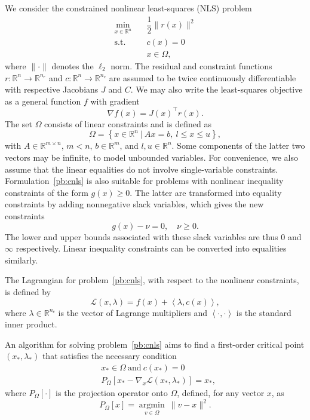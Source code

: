 \documentclass[pdflatex,sn-mathphys-num]{sn-jnl}%
\theoremstyle{thmstyleone}%
\newcommand{\RR}{{\mathbb{R}}} %
\newcommand{\calL}{{\mathcal{L}}}
\providecommand{\argmin}{\operatorname*{argmin}}
\newcommand{\inner}[2]{\left\langle {#1} , {#2} \right\rangle} %
\newcommand{\proj}[2]{P_{#1} \left[ {#2} \right]} %
\begin{document}
We consider the constrained nonlinear least-squares (NLS) problem
\begin{equation}
	\label{pb:cnls}
	\begin{aligned}
		\min_{x\in \RR^n} \quad & \dfrac{1}{2} \|r(x)\|^2 \\
		\text{s.t.} \quad & c(x) = 0 \\
		& x \in \Omega,
	\end{aligned}
\end{equation}
where $\|\cdot\|$ denotes the $\ell_2$ norm. The residual and constraint functions $r\colon \RR^n \to \RR^{n_r}$ and $c\colon \RR^n \to \RR^{n_c}$ are assumed to be twice continuously differentiable with respective Jacobians $J$ and $C$. We may also write the least-squares objective as a general function $f$ with gradient 
\[\nabla f(x) = J(x)^\top r(x).\] 
The set $\Omega$ consists of linear constraints and is defined as
\begin{equation}\label{eq:linear_constraints}
	\Omega = \left\{ x \in \RR^n \ | \ Ax=b,\ l \le x \le u\right\},
\end{equation}
with $A\in\RR^{m\times n}$, $m < n$, $b\in \RR^m$, and $l,u \in \RR^n$. Some components of the latter two vectors may be infinite, to model unbounded variables. For convenience, we also assume that the linear equalities do not involve single-variable constraints. Formulation~\eqref{pb:cnls} is also suitable for problems with nonlinear inequality constraints of the form $g(x) \ge 0$. The latter are transformed into equality constraints by adding nonnegative slack variables, which gives the new constraints
\begin{equation*}
	g(x) - \nu = 0,\quad \nu \ge 0.
\end{equation*}
The lower and upper bounds associated with these slack variables are thus $0$ and $\infty$ respectively. Linear inequality constraints can be converted into equalities similarly.

The Lagrangian for problem~\eqref{pb:cnls}, with respect to the nonlinear constraints, is defined by 
\begin{equation*}
	\calL(x,\lambda) = f(x) + \inner{\lambda}{c(x)},
\end{equation*}
where $\lambda \in \RR^{n_c}$ is the vector of Lagrange multipliers and $\inner{\cdot}{\cdot}$ is the standard inner product.

An algorithm for solving problem~\eqref{pb:cnls} aims to find a first-order critical point $(x_*,\lambda_*)$ that satisfies the necessary condition
\begin{equation*}
	\begin{aligned}
		&x_* \in \Omega\ \text{and}\ c(x_*)=0 \\
		&\proj{\Omega}{x_*-\nabla_x \calL(x_*,\lambda_*)}=x_*,
	\end{aligned}
\end{equation*}
where $\proj{\Omega}{\cdot}$ is the projection operator onto $\Omega$, defined, for any vector $x$, as
\begin{equation*}
	\proj{\Omega}{x}= \argmin_{v\in \Omega} \ \|v-x\|^2. 
\end{equation*}
\end{document}
